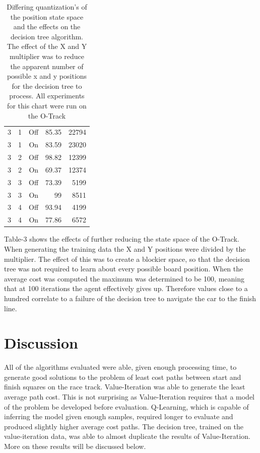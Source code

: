 \documentclass[12pt,letterpaper]{article}
\begin{document}
\begin{table}[h]
\begin{tabular}{rrrrr}
         3 &          1 &        Off &      85.35 &      22794 \\

         3 &          1 &         On &      83.59 &      23020 \\

         3 &          2 &        Off &      98.82 &      12399 \\

         3 &          2 &         On &      69.37 &      12374 \\

         3 &          3 &        Off &      73.39 &       5199 \\

         3 &          3 &         On &         99 &       8511 \\

         3 &          4 &        Off &      93.94 &       4199 \\

         3 &          4 &         On &      77.86 &       6572 \\

\end{tabular}  
\caption{Differing quantization's of the position state space and the effects on the decision tree algorithm. The effect of the X and Y multiplier was to reduce the apparent number of possible x and y positions for the decision tree to process. All experiments for this chart were run on the O-Track}

\end{table}

Table-3 shows the effects of further reducing the state space of the O-Track. When generating the training data the X and Y positions were divided by the multiplier. The effect of this was to create a blockier space, so that the decision tree was not required to learn about every possible board position. When the average cost was computed the maximum was determined to be 100, meaning that at 100 iterations the agent effectively gives up. Therefore values close to a hundred correlate to a failure of the decision tree to navigate the car to the finish line. 



\section{Discussion}
All of the algorithms evaluated were able, given enough processing time, to generate good solutions to the problem of least cost paths between start and finish squares on the race track. Value-Iteration was able to generate the least average path cost. This is not surprising as Value-Iteration requires that a model of the problem be developed before evaluation. Q-Learning, which is capable of inferring the model given enough samples, required longer to evaluate and produced slightly higher average cost paths. The decision tree, trained on the value-iteration data, was able to almost duplicate the results of Value-Iteration. More on these results will be discussed below. 
\end{document}
